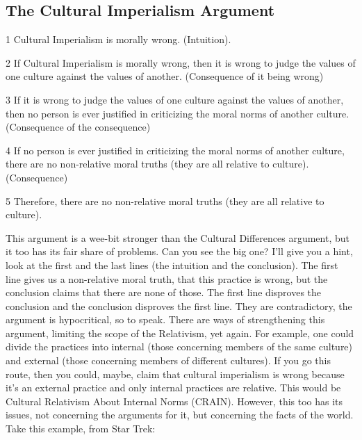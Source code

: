 \subsection{The Cultural Imperialism Argument}
\begin{earg}
    \item[1]Cultural Imperialism is morally wrong. (Intuition).
    \item[2]If Cultural Imperialism is morally wrong, then it is wrong to judge the values of one culture against the values of another. (Consequence of it being wrong)
    \item[3]If it is wrong to judge the values of one culture against the values of another, then no person is ever justified in criticizing the moral norms of another culture. (Consequence of the consequence)
    \item[4]If no person is ever justified in criticizing the moral norms of another culture, there are no non-relative moral truths (they are all relative to culture). (Consequence)
    \item[5]Therefore, there are no non-relative moral truths (they are all relative to culture).
\end{earg}

This argument is a wee-bit stronger than the Cultural  Differences argument, but it too has its fair share of problems. Can you see the big one? I'll give you a hint, look at the first and the last lines (the intuition and the conclusion). The first line gives us a non-relative moral truth, that this practice is wrong, but the conclusion claims that there are none of those. The first line disproves the conclusion and the conclusion disproves the first line. They are contradictory, the argument is hypocritical, so to speak. There are ways of strengthening this argument, limiting the scope of the Relativism, yet again. For example, one could divide the practices into internal (those concerning members of the same culture) and external (those concerning members of different cultures). If you go this route, then you could, maybe, claim that cultural imperialism is wrong because it's an external practice and only internal practices are relative. This would be Cultural Relativism About Internal Norms (CRAIN). However, this too has its issues, not concerning the arguments for it, but concerning the facts of the world. Take this example, from Star Trek:


